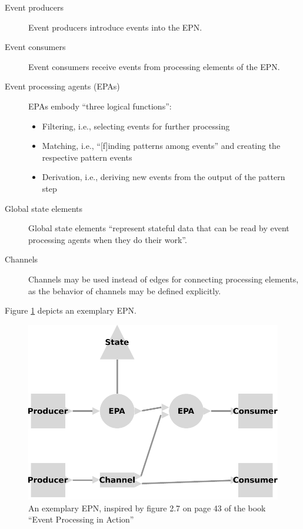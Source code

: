 \documentclass[article, 10pt, type=bsc, colorback, accentcolor=tud8b, parskip=half, bibliography=totocnumbered]{tudthesis}
\begin{document}
\begin{description}
\item[Event producers]
Event producers introduce events into the EPN.
\item[Event consumers]
Event consumers receive events from processing elements of the EPN.
\item[Event processing agents (EPAs)]
EPAs embody ``three logical functions'':
\begin{itemize}
\item
Filtering, i.e., selecting events for further processing
\item
Matching, i.e., ``[f]inding patterns among events'' and creating the respective pattern events
\item
Derivation, i.e., deriving new events from the output of the pattern step
\end{itemize}
\item[Global state elements]
Global state elements ``represent stateful data that can be read by event processing agents when they do their work''.
\item[Channels]
Channels may be used instead of edges for connecting processing elements, as the behavior of channels may be defined explicitly.
\end{description}

Figure \ref{fig:epn} depicts an exemplary EPN.

\begin{figure}
\caption{An exemplary EPN, inspired by figure 2.7 on page 43 of the book ``Event Processing in Action'' \cite{Etzion:2010:EPA:1894960}}
\label{fig:epn}
\includegraphics[scale=0.7]{images/epn.pdf}
\centering
\end{figure}
\end{document}
